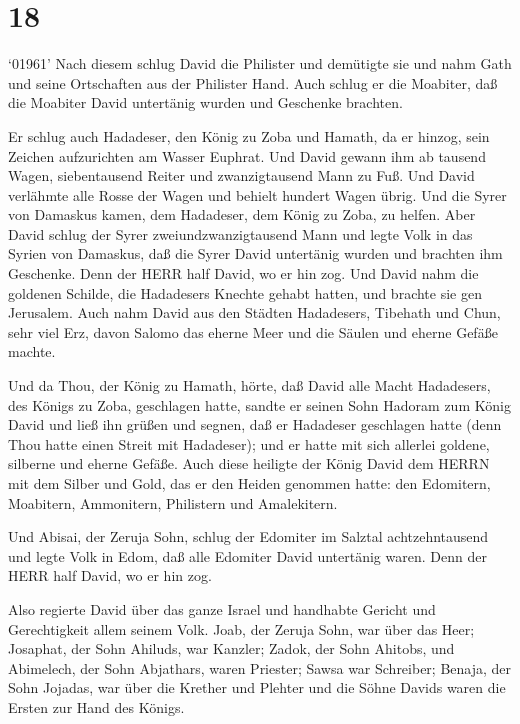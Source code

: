\hypertarget{section-17}{%
\section{18}\label{section-17}}

 `01961' Nach diesem schlug David die Philister und
demütigte sie und nahm Gath und seine Ortschaften aus der Philister
Hand.  Auch schlug er die Moabiter, daß die Moabiter David
untertänig wurden und Geschenke brachten.

 Er schlug auch Hadadeser, den König zu Zoba und Hamath, da
er hinzog, sein Zeichen aufzurichten am Wasser Euphrat.  Und
David gewann ihm ab tausend Wagen, siebentausend Reiter und
zwanzigtausend Mann zu Fuß. Und David verlähmte alle Rosse der Wagen und
behielt hundert Wagen übrig.  Und die Syrer von Damaskus
kamen, dem Hadadeser, dem König zu Zoba, zu helfen. Aber David schlug
der Syrer zweiundzwanzigtausend Mann  und legte Volk in das
Syrien von Damaskus, daß die Syrer David untertänig wurden und brachten
ihm Geschenke. Denn der HERR half David, wo er hin zog.  Und
David nahm die goldenen Schilde, die Hadadesers Knechte gehabt hatten,
und brachte sie gen Jerusalem.  Auch nahm David aus den
Städten Hadadesers, Tibehath und Chun, sehr viel Erz, davon Salomo das
eherne Meer und die Säulen und eherne Gefäße machte.

 Und da Thou, der König zu Hamath, hörte, daß David alle
Macht Hadadesers, des Königs zu Zoba, geschlagen hatte, 
sandte er seinen Sohn Hadoram zum König David und ließ ihn grüßen und
segnen, daß er Hadadeser geschlagen hatte (denn Thou hatte einen Streit
mit Hadadeser); und er hatte mit sich allerlei goldene, silberne und
eherne Gefäße.  Auch diese heiligte der König David dem
HERRN mit dem Silber und Gold, das er den Heiden genommen hatte: den
Edomitern, Moabitern, Ammonitern, Philistern und Amalekitern.

 Und Abisai, der Zeruja Sohn, schlug der Edomiter im
Salztal achtzehntausend  und legte Volk in Edom, daß alle
Edomiter David untertänig waren. Denn der HERR half David, wo er hin
zog.

 Also regierte David über das ganze Israel und handhabte
Gericht und Gerechtigkeit allem seinem Volk.  Joab, der
Zeruja Sohn, war über das Heer; Josaphat, der Sohn Ahiluds, war Kanzler;
 Zadok, der Sohn Ahitobs, und Abimelech, der Sohn
Abjathars, waren Priester; Sawsa war Schreiber;  Benaja,
der Sohn Jojadas, war über die Krether und Plehter und die Söhne Davids
waren die Ersten zur Hand des Königs.

